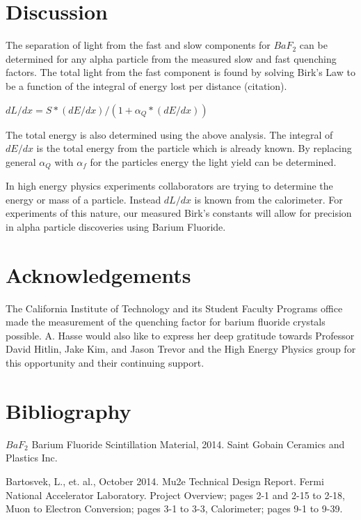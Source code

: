 \documentclass{article}
\begin{document}
\section{Discussion}

The separation of light from the fast and slow components for $BaF_2$ can be determined for any alpha particle from the measured slow and fast quenching factors. The total light from the fast component is found by solving Birk's Law to be a function of the integral of energy lost per distance (citation). 

\noindent
$ dL/dx = S * (dE/dx)/(1 + \alpha_Q * (dE/dx)) $

The total energy is also determined using the above analysis. The integral of $dE/dx$ is the total energy from the particle which is already known. By replacing general $\alpha_Q$ with $\alpha_f$ for the particles energy the light yield can be determined. 

In high energy physics experiments collaborators are trying to determine the energy or mass of a particle. Instead $dL/dx$ is known from the calorimeter. For experiments of this nature, our measured Birk's constants will allow for precision in alpha particle discoveries using Barium Fluoride. 



\section{Acknowledgements}

The California Institute of Technology and its Student Faculty Programs office made the measurement of the quenching factor for barium fluoride crystals possible. A. Hasse would also like to express her deep gratitude towards Professor David Hitlin, Jake Kim, and Jason Trevor and the High Energy Physics group for this opportunity and their continuing support. 


\setlength{\parskip}{2em}
\noindent
\section{Bibliography}


\noindent
$BaF_2$ Barium Fluoride Scintillation Material, 2014. Saint Gobain Ceramics and Plastics Inc. 

\noindent
Bartosvek, L., et. al., October 2014. Mu2e Technical Design Report. Fermi National Accelerator Laboratory. Project Overview; pages 2-1 and 2-15 to 2-18, Muon to Electron Conversion; pages 3-1 to 3-3, Calorimeter; pages 9-1 to 9-39.
\end{document}
